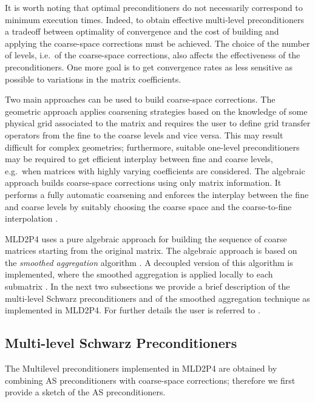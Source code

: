 It is worth noting that optimal preconditioners do not necessarily correspond
to minimum execution times. Indeed, to obtain effective multi-level preconditioners
a tradeoff between optimality of convergence and the cost of building and applying
the coarse-space corrections must be achieved. The choice of the number of levels,
i.e.\ of the coarse-space corrections, also affects the effectiveness of the
preconditioners. One more goal is to get convergence rates as less sensitive
as possible to variations in the matrix coefficients.

Two main approaches can be used to build coarse-space corrections. The geometric approach
applies coarsening strategies based on the knowledge of some physical grid associated
to the matrix and requires the user to define grid transfer operators from the fine
to the coarse levels and vice versa. This may result difficult for complex geometries;
furthermore, suitable one-level preconditioners may be required to get efficient
interplay between fine and coarse levels, e.g.\ when matrices with highly varying coefficients
are considered. The algebraic approach builds coarse-space corrections using only matrix
information. It performs a fully automatic coarsening and enforces the interplay between
the fine and coarse levels by suitably choosing the coarse space and the coarse-to-fine
interpolation \cite{StubenGMD69_99}.

MLD2P4 uses a pure algebraic approach for building the sequence of coarse matrices
starting from the original matrix. The algebraic approach is based on the \emph{smoothed 
aggregation} algorithm \cite{BREZINA_VANEK,VANEK_MANDEL_BREZINA}. A decoupled version
of this algorithm is implemented, where the smoothed aggregation is applied locally
to each submatrix \cite{TUMINARO_TONG}. In the next two subsections we provide
a brief description of the multi-level Schwarz preconditioners and of the smoothed
aggregation technique as implemented in MLD2P4. For further details the user
is referred to \cite{para_04,aaecc_07,apnum_07,dd2_96}.


\subsection{Multi-level Schwarz Preconditioners\label{sec:multilevel}}

The Multilevel preconditioners implemented in MLD2P4 are obtained by combining
AS preconditioners with coarse-space corrections; therefore
we first provide a sketch of the AS preconditioners.

